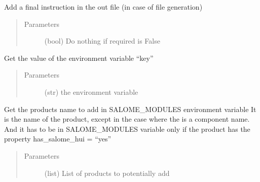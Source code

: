 \documentclass[a4paper,10pt,english]{sphinxmanual}
\begin{document}
\begin{fulllineitems}
\begin{fulllineitems}
\end{fulllineitems}


\begin{fulllineitems}
\label{\detokenize{apidoc_src/src:src.environment.SalomeEnviron.finish}}
Add a final instruction in the out file (in case of file generation)
\begin{quote}\begin{description}
\item[{Parameters}] \leavevmode
{} \textendash{} (bool) Do nothing if required is False

\end{description}\end{quote}

\end{fulllineitems}


\begin{fulllineitems}
\label{\detokenize{apidoc_src/src:src.environment.SalomeEnviron.get}}
Get the value of the environment variable “key”
\begin{quote}\begin{description}
\item[{Parameters}] \leavevmode
{} \textendash{} (str) the environment variable

\end{description}\end{quote}

\end{fulllineitems}


\begin{fulllineitems}
\label{\detokenize{apidoc_src/src:src.environment.SalomeEnviron.get_names}}
Get the products name to add in SALOME\_MODULES environment variable
It is the name of the product, except in the case where the is a 
component name. And it has to be in SALOME\_MODULES variable only 
if the product has the property has\_salome\_hui = “yes”
\begin{quote}\begin{description}
\item[{Parameters}] \leavevmode
{} \textendash{} (list) List of products to potentially add


\end{description}
\end{quote}
\end{fulllineitems}
\end{fulllineitems}
\end{document}
